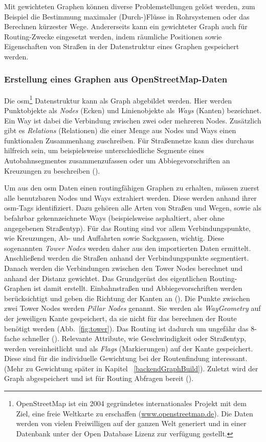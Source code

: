 Mit gewichteten Graphen können diverse Problemstellungen gelöst werden, zum Beispiel die Bestimmung maximaler (Durch-)Flüsse in Rohrsystemen oder das Berechnen kürzester Wege.
Andererseits kann ein gewichteter Graph auch für Routing-Zwecke eingesetzt werden, indem räumliche Positionen sowie Eigenschaften von Straßen in der Datenstruktur eines Graphen gespeichert werden.

\subsubsection{Erstellung eines Graphen aus OpenStreetMap-Daten}
\label{sec:osmgraph}

Die \gls{osm}\footnote{OpenStreetMap ist ein 2004 gegründetes internationales Projekt mit dem Ziel, eine freie Weltkarte zu erschaffen (\href{www.openstreetmap.de}{www.openstreetmap.de}). Die Daten werden von vielen Freiwilligen auf der ganzen Welt generiert und in einer Datenbank unter der Open Database Lizenz zur verfügung gestellt.} Datenstruktur kann als Graph abgebildet werden.
Hier werden Punktobjekte als \textit{Nodes} (Ecken) und Linienobjekte als \textit{Ways} (Kanten) bezeichnet.
Ein Way ist dabei die Verbindung zwischen zwei oder mehreren Nodes.
Zusätzlich gibt es \textit{Relations} (Relationen) die einer Menge aus Nodes und Ways einen funktionalen Zusammenhang zuschreiben.
Für Straßennetze kann dies durchaus hilfreich sein, um beispielsweise unterschiedliche Segmente eines Autobahnsegmentes zusammenzufassen oder um Abbiegevorschriften an Kreuzungen zu beschreiben (\cite{osmrelation}).

Um aus den \gls{osm} Daten einen routingfähigen Graphen zu erhalten, müssen zuerst alle benutzbaren Nodes und Ways extrahiert werden.
Diese werden anhand ihrer \gls{osm}-Tags identifiziert.
Dazu gehören alle Arten von Straßen und Wegen, sowie als befahrbar gekennzeichnete Ways (beispielsweise asphaltiert, aber ohne angegebenen Straßentyp).
Für das Routing sind vor allem Verbindungspunkte, wie Kreuzungen, Ab- und Auffahrten sowie Sackgassen, wichtig.
Diese sogenannten \textit{Tower Nodes} werden daher aus den importierten Daten ermittelt.
Anschließend werden die Straßen anhand der Verbindungspunkte segmentiert.
Danach werden die Verbindungen zwischen den Tower Nodes berechnet und anhand der Distanz gewichtet.
Das Grundgerüst des eigentlichen Routing-Graphen ist damit erstellt.
Einbahnstraßen und Abbiegevorschriften werden berücksichtigt und geben die Richtung der Kanten an (\cite{osmgraph}).
Die Punkte zwischen zwei Tower Nodes werden \textit{Pillar Nodes} genannt.
Sie werden als \textit{WayGeometry} auf der jeweiligen Kante gespeichert, da sie nicht für das berechnen der Route benötigt werden (Abb.~\ref{fig:tower}).
Das Routing ist dadurch um ungefähr das 8-fache schneller (\cite{graphhopper}).
Relevante Attribute, wie Geschwindigkeit oder Straßentyp, werden vereinheitlicht und als \textit{Flags} (Markierungen) auf der Kante gespeichert.
Diese sind für die individuelle Gewichtung bei der Routenfindung interessant.
(Mehr zu Gewichtung später in Kapitel ~\ref{backendGraphBuild}).
Zuletzt wird der Graph abgespeichert und ist für Routing Abfragen bereit (\cite{osmgraph}).


